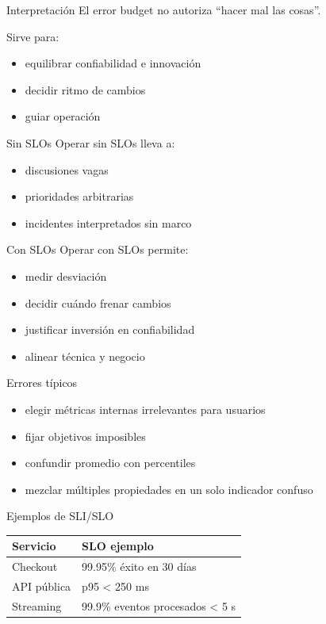 \documentclass[institutional,screen,none]{ua-engineering-v6-beamer}
\begin{document}
\begin{frame}{Interpretación}
El error budget no autoriza “hacer mal las cosas”.

\pause

Sirve para:
\begin{itemize}
\item equilibrar confiabilidad e innovación
\item decidir ritmo de cambios
\item guiar operación
\end{itemize}
\end{frame}


\begin{frame}{Sin SLOs}
Operar sin SLOs lleva a:
\begin{itemize}
\item discusiones vagas
\item prioridades arbitrarias
\item incidentes interpretados sin marco
\end{itemize}
\end{frame}

\begin{frame}{Con SLOs}
Operar con SLOs permite:
\begin{itemize}
\item medir desviación
\item decidir cuándo frenar cambios
\item justificar inversión en confiabilidad
\item alinear técnica y negocio
\end{itemize}
\end{frame}


\begin{frame}{Errores típicos}
\begin{itemize}
\item elegir métricas internas irrelevantes para usuarios
\item fijar objetivos imposibles
\item confundir promedio con percentiles
\item mezclar múltiples propiedades en un solo indicador confuso
\end{itemize}
\end{frame}

\begin{frame}{Ejemplos de SLI/SLO}
\begin{center}
\begin{tabular}{ll}
\toprule
Servicio & SLO ejemplo \\
\midrule
Checkout & 99.95\% éxito en 30 días \\
API pública & p95 < 250 ms \\
Streaming & 99.9\% eventos procesados < 5 s \\
\bottomrule
\end{tabular}
\end{center}
\end{frame}
\end{document}
